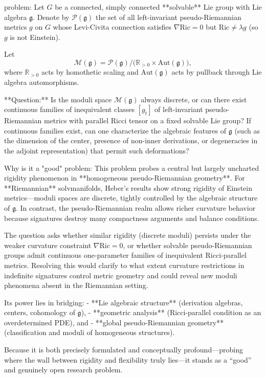 problem:  
Let \( G \) be a connected, simply connected **solvable** Lie group with Lie algebra \( \mathfrak{g} \).  
Denote by \( \mathcal{P}(\mathfrak{g}) \) the set of all left-invariant pseudo-Riemannian metrics \( g \) on \( G \) whose Levi-Civita connection satisfies \( \nabla \mathrm{Ric} = 0 \) but \( \mathrm{Ric} \neq \lambda g \) (so \( g \) is not Einstein).  

Let  
\[
\mathcal{M}(\mathfrak{g}) = \mathcal{P}(\mathfrak{g}) / \big( \mathbb{R}_{>0} \times \mathrm{Aut}(\mathfrak{g}) \big),
\]
where \(\mathbb{R}_{>0}\) acts by homothetic scaling and \(\mathrm{Aut}(\mathfrak{g})\) acts by pullback through Lie algebra automorphisms.

**Question:**  
Is the moduli space \(\mathcal{M}(\mathfrak{g})\) always discrete, or can there exist continuous families of inequivalent classes \([g_t]\) of left-invariant pseudo-Riemannian metrics with parallel Ricci tensor on a fixed solvable Lie group?  
If continuous families exist, can one characterize the algebraic features of \(\mathfrak{g}\) (such as the dimension of the center, presence of non-inner derivations, or degeneracies in the adjoint representation) that permit such deformations?  

Why is it a "good" problem:  
This problem probes a central but largely uncharted rigidity phenomenon in **homogeneous pseudo-Riemannian geometry**. For **Riemannian** solvmanifolds, Heber’s results show strong rigidity of Einstein metrics—moduli spaces are discrete, tightly controlled by the algebraic structure of \( \mathfrak{g} \). In contrast, the pseudo-Riemannian realm allows richer curvature behavior because signatures destroy many compactness arguments and balance conditions.  

The question asks whether similar rigidity (discrete moduli) persists under the weaker curvature constraint \( \nabla \mathrm{Ric} = 0 \), or whether solvable pseudo-Riemannian groups admit continuous one-parameter families of inequivalent Ricci-parallel metrics. Resolving this would clarify to what extent curvature restrictions in indefinite signatures control metric geometry and could reveal new moduli phenomena absent in the Riemannian setting.  

Its power lies in bridging:  
- **Lie algebraic structure** (derivation algebras, centers, cohomology of \(\mathfrak{g}\)),  
- **geometric analysis** (Ricci-parallel condition as an overdetermined PDE), and  
- **global pseudo-Riemannian geometry** (classification and moduli of homogeneous structures).  

Because it is both precisely formulated and conceptually profound—probing where the wall between rigidity and flexibility truly lies—it stands as a “good” and genuinely open research problem.